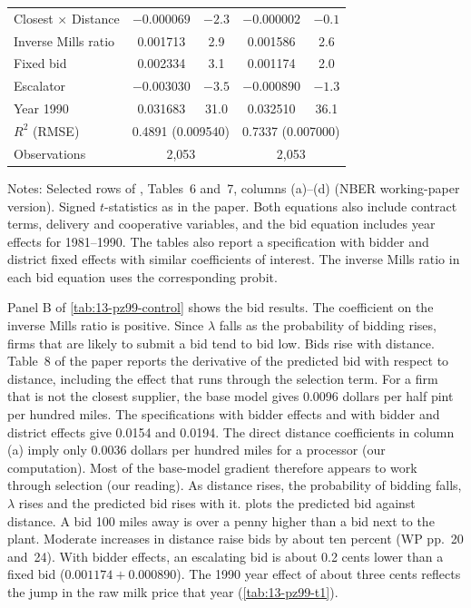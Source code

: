 \begin{table}[htbp]
\begin{tabular}{@{}lcccc@{}}
Closest $\times$ Distance     & $-0.000069$ & $-2.3$ & $-0.000002$ & $-0.1$\\
Inverse Mills ratio           & 0.001713 & 2.9 & 0.001586 & 2.6\\
Fixed bid                     & 0.002334 & 3.1 & 0.001174 & 2.0\\
Escalator                     & $-0.003030$ & $-3.5$ & $-0.000890$ & $-1.3$\\
Year 1990                     & 0.031683 & 31.0 & 0.032510 & 36.1\\
$R^2$ (RMSE)                  & \multicolumn{2}{c}{0.4891 (0.009540)} & \multicolumn{2}{c}{0.7337 (0.007000)}\\
Observations                  & \multicolumn{2}{c}{2,053} & \multicolumn{2}{c}{2,053}\\
\bottomrule
\end{tabular}

\smallskip
\begin{minipage}{0.92\textwidth}\footnotesize
Notes: Selected rows of \citet{PorterZona1999}, Tables~6 and~7, columns (a)--(d) (NBER working-paper version). Signed $t$-statistics as in the paper. Both equations also include contract terms, delivery and
cooperative variables, and the bid equation includes year effects for 1981--1990. The tables also report a
specification with bidder and district fixed effects with similar coefficients of interest. The inverse Mills ratio
in each bid equation uses the corresponding probit.
\end{minipage}
\end{table}

Panel B of \cref{tab:13-pz99-control} shows the bid results. The coefficient on the inverse Mills ratio is positive.
Since $\lambda$ falls as the probability of bidding rises, firms that are likely to submit a bid tend to bid low.
Bids rise with distance. Table~8 of the paper reports the derivative of the predicted bid with respect to distance,
including the effect that runs through the selection term. For a firm that is not the closest supplier, the base
model gives 0.0096 dollars per half pint per hundred miles. The specifications with bidder effects and with bidder
and district effects give 0.0154 and 0.0194. The direct distance coefficients in column (a) imply only 0.0036 dollars per hundred miles for
a processor (our computation). Most of the base-model gradient therefore appears to work through selection (our
reading). As distance rises, the probability of bidding falls, $\lambda$ rises and the predicted bid rises with it.  plots
the predicted bid against distance. A bid 100 miles away is over a penny higher than a bid next to the plant.
Moderate increases in distance raise bids by about ten percent (WP pp.~20 and~24). With bidder effects, an escalating
bid is about 0.2 cents lower than a fixed bid ($0.001174 + 0.000890$). The 1990 year effect of about three cents
reflects the jump in the raw milk price that year (\cref{tab:13-pz99-t1}).

